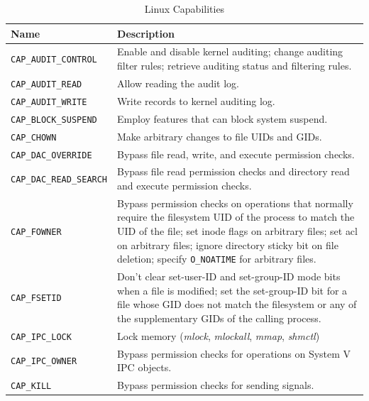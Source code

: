 \documentclass[a4paper]{article}
\begin{document}
\begin{table}
\renewcommand{\arraystretch}{1.25}
\centering
\caption{Linux Capabilities}
\label{tbl:linuxcaps}
\begin{tabular}{@{}lp{8cm}@{}}
\toprule
Name & Description\\
\midrule
\verb|CAP_AUDIT_CONTROL| &
Enable and disable kernel auditing; change auditing filter rules; 
retrieve auditing status and filtering rules.\\

\verb|CAP_AUDIT_READ| &
Allow reading the audit log.\\

\verb|CAP_AUDIT_WRITE| &
Write records to kernel auditing log.\\

\verb|CAP_BLOCK_SUSPEND| &
Employ features that can block system suspend.\\

\verb|CAP_CHOWN| &
Make arbitrary changes to file UIDs and GIDs.\\

\verb|CAP_DAC_OVERRIDE| &
Bypass file read, write, and execute permission checks.\\

\verb|CAP_DAC_READ_SEARCH| &
Bypass file read permission checks and directory read and execute permission checks.\\

\verb|CAP_FOWNER| &
Bypass permission checks on operations that normally require the filesystem UID of the process to match the UID of the file; set inode flags on arbitrary files; set \gls{acl} on arbitrary files; ignore directory sticky bit on file deletion; specify \verb|O_NOATIME| for arbitrary files.\\

\verb|CAP_FSETID| &
Don't clear set-user-ID and set-group-ID mode bits when a file is modified; set the set-group-ID bit for a file whose GID does not match the filesystem or any of the supplementary GIDs of the calling process.\\

\verb|CAP_IPC_LOCK| &
Lock memory (\emph{mlock}, \emph{mlockall}, \emph{mmap}, \emph{shmctl})\\

\verb|CAP_IPC_OWNER| &
Bypass permission checks for operations on System V IPC objects.\\

\verb|CAP_KILL| &
Bypass permission checks for sending signals.\\


\end{tabular}
\end{table}
\end{document}
